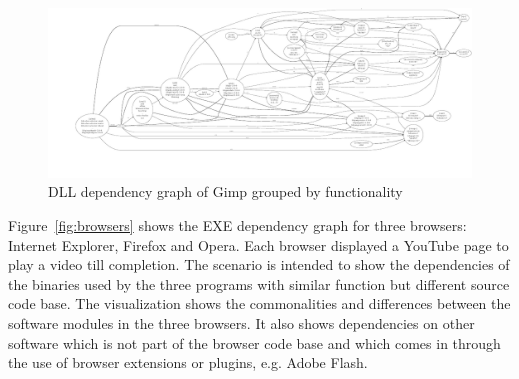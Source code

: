\begin{figure}
\includegraphics[width=1.0\textwidth]{depvis/gimp-function-removed.pdf}
\caption{DLL dependency graph of Gimp grouped by functionality}
\label{fig:gimp-function}
\end{figure}

Figure~\ref{fig:browsers} shows the EXE dependency graph for three
brow\-sers: Internet Explorer, Firefox and Opera.
Each browser displayed a YouTube page to play a
video till completion. The scenario is intended to show the dependencies
of the binaries used by the three programs
with similar function but different source code base.
The visualization shows the commonalities and differences
between the software modules in the three browsers.
It also shows dependencies on other software which is not part of
the browser code base and
which comes in through the use of browser extensions or plugins,
e.g. Adobe Flash.

